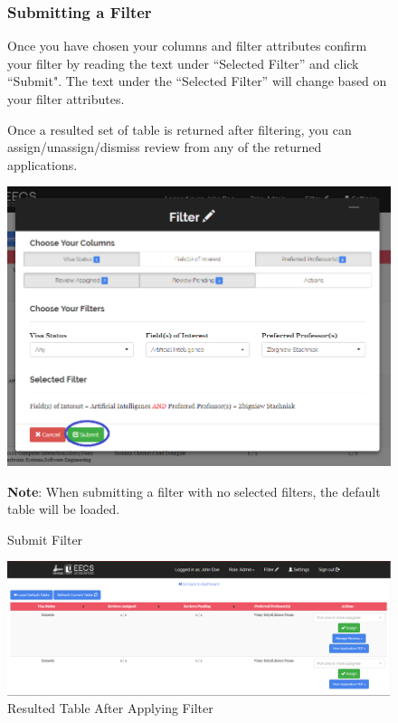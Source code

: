 \documentclass[fontsize=12pt,paper=letter,twoside]{scrartcl}
\begin{document}
\clearpage 
\begin{figure}[!htb]
\subsubsection{Submitting a Filter}
Once you have chosen your columns and filter attributes confirm your filter by reading the text under ``Selected Filter'' and click ``Submit". The text under the ``Selected Filter'' will change based on your filter attributes.

\bigskip
\noindent Once a resulted set of table is returned after filtering, you can assign/unassign/dismiss review from any of the returned applications.

\begin{center}
\includegraphics[width=.99\textwidth]{images/mr/submit_filter.png}
\end{center}
\caption{Submit Filter}
\textbf{Note}: When submitting a filter with no selected filters, the default table will be loaded.
\label{fig:submit_filter}
\end{figure}

\begin{figure}[!htb]
\begin{center}
\includegraphics[width=.99\textwidth]{images/mr/example_filter_table.png}
\end{center}
\caption{Resulted Table After Applying Filter}
\label{fig:resulted_table}
\end{figure}
\end{document}
